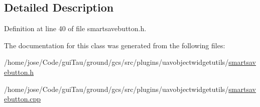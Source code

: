 \subsection{Detailed Description}


Definition at line 40 of file smartsavebutton.\-h.



The documentation for this class was generated from the following files\-:\begin{DoxyCompactItemize}
\item 
/home/jose/\-Code/gui\-Tau/ground/gcs/src/plugins/uavobjectwidgetutils/\hyperlink{smartsavebutton_8h}{smartsavebutton.\-h}\item 
/home/jose/\-Code/gui\-Tau/ground/gcs/src/plugins/uavobjectwidgetutils/\hyperlink{smartsavebutton_8cpp}{smartsavebutton.\-cpp}\end{DoxyCompactItemize}
